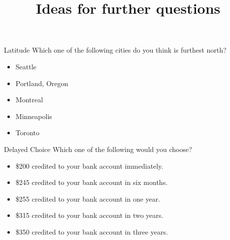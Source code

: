 \documentclass{beamer}
\title{Ideas for further questions}
\begin{document}
\begin{frame}{Latitude}
Which one of the following cities do you think is furthest north?

\begin{itemize}
	\item Seattle
	\item Portland, Oregon
	\item Montreal
	\item Minneapolis
	\item Toronto
\end{itemize}
\end{frame}

\begin{frame}{Delayed Choice}
Which one of the following would you choose?

\begin{itemize}
	\item \$200 credited to your bank account immediately.
	\item \$245 credited to your bank account in six months.
	\item \$255 credited to your bank account in one year.
	\item \$315 credited to your bank account in two years.
	\item \$350 credited to your bank account in three years.
\end{itemize}
\end{frame}
\end{document}
